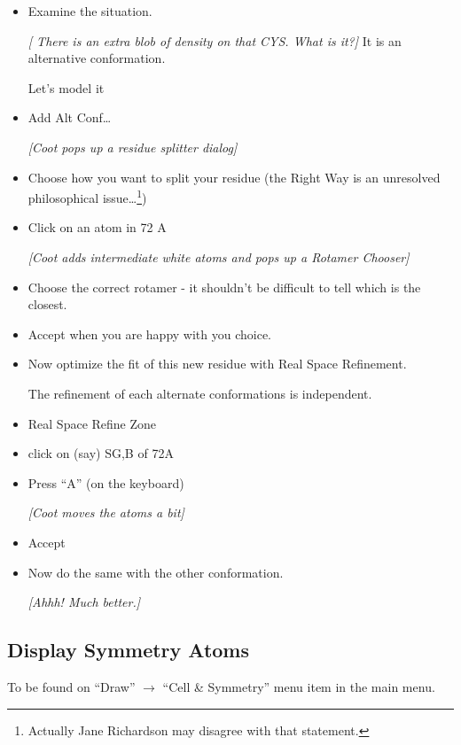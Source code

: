 \documentclass{article}
\begin{document}
\begin{itemize}
\item Examine the situation.

\emph{[ There is an extra blob of density on that CYS.  What is it?]}
It is an alternative conformation.

Let's model it

\item \textsf{Add Alt Conf\ldots}

\textsl{  [Coot pops up a residue splitter dialog]}

\item Choose how you want to split your residue (the Right Way is an
  unresolved philosophical issue\ldots\footnote{Actually Jane Richardson may disagree with that statement.})

\item Click on an atom in 72 A
  
  \textsl{ [Coot adds intermediate white atoms and pops up a Rotamer
    Chooser]}
  
\item Choose the correct rotamer - it shouldn't be difficult to tell
  which is the closest.

\item \textsf{Accept} when you are happy with you choice.
  
\item Now optimize the fit of this new residue with Real Space
  Refinement.

The refinement of each alternate conformations is independent.

\item \textsf{Real Space Refine Zone}

\item click on (say) SG,B of 72A

\item Press ``A'' (on the keyboard)

  \textsl{ [Coot moves the atoms a bit]}

\item \textsf{Accept}

\item Now do the same with the other conformation.

   \emph{  [Ahhh!  Much better.]}

\end{itemize}


\subsection{Display Symmetry Atoms}
To be found on \textsf{``Draw'' $\rightarrow$ ``Cell \& Symmetry''}
menu item in the main menu.
\end{document}
